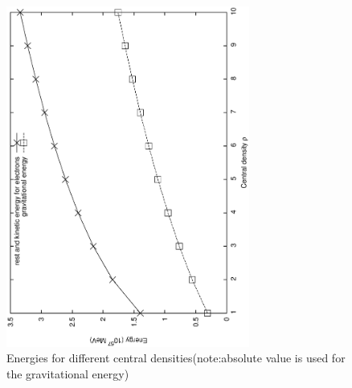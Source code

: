 \documentclass{article}
\begin{document}
\begin{figure}[H]
\includegraphics[width=8cm, angle=270]{system_energy}
\caption{Energies for different central densities(note:absolute value is used for the gravitational energy)}
\label{fig:energy}
\end{figure}
\end{document}
